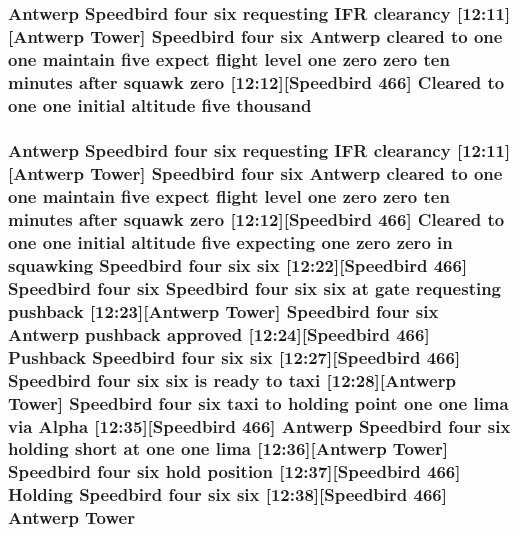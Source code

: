 \subsubsection[{\texorpdfstring{thousand}{thousand}}]{\setlength{\rightskip}{0pt plus 5cm}Antwerp Speedbird four {\bf six} requesting I\+FR clearancy \mbox{[}12\+:11\mbox{]}\mbox{[}Antwerp {\bf Tower}\mbox{]} Speedbird four {\bf six} Antwerp cleared to {\bf one} {\bf one} maintain five expect flight level {\bf one} {\bf zero} {\bf zero} {\bf ten} minutes after squawk {\bf zero} \mbox{[}12\+:12\mbox{]}\mbox{[}Speedbird 466\mbox{]} Cleared to {\bf one} {\bf one} initial altitude five thousand}\hypertarget{happyDay5ExpectedATC_8txt_a429913a0643fe14faca3dca538caa7bb}{}\label{happyDay5ExpectedATC_8txt_a429913a0643fe14faca3dca538caa7bb}
\subsubsection[{\texorpdfstring{Tower}{Tower}}]{\setlength{\rightskip}{0pt plus 5cm}Antwerp Speedbird four {\bf six} requesting I\+FR clearancy \mbox{[}12\+:11\mbox{]}\mbox{[}Antwerp Tower\mbox{]} Speedbird four {\bf six} Antwerp cleared to {\bf one} {\bf one} maintain five expect flight level {\bf one} {\bf zero} {\bf zero} {\bf ten} minutes after squawk {\bf zero} \mbox{[}12\+:12\mbox{]}\mbox{[}Speedbird 466\mbox{]} Cleared to {\bf one} {\bf one} initial altitude five expecting {\bf one} {\bf zero} {\bf zero} in {\bf squawking} Speedbird four {\bf six} {\bf six} \mbox{[}12\+:22\mbox{]}\mbox{[}Speedbird 466\mbox{]} Speedbird four {\bf six} Speedbird four {\bf six} {\bf six} at gate requesting pushback \mbox{[}12\+:23\mbox{]}\mbox{[}Antwerp Tower\mbox{]} Speedbird four {\bf six} Antwerp pushback {\bf approved} \mbox{[}12\+:24\mbox{]}\mbox{[}Speedbird 466\mbox{]} Pushback Speedbird four {\bf six} {\bf six} \mbox{[}12\+:27\mbox{]}\mbox{[}Speedbird 466\mbox{]} Speedbird four {\bf six} {\bf six} is ready to taxi \mbox{[}12\+:28\mbox{]}\mbox{[}Antwerp Tower\mbox{]} Speedbird four {\bf six} taxi to holding point {\bf one} {\bf one} {\bf lima} via {\bf Alpha} \mbox{[}12\+:35\mbox{]}\mbox{[}Speedbird 466\mbox{]} Antwerp Speedbird four {\bf six} holding short at {\bf one} {\bf one} {\bf lima} \mbox{[}12\+:36\mbox{]}\mbox{[}Antwerp Tower\mbox{]} Speedbird four {\bf six} hold {\bf position} \mbox{[}12\+:37\mbox{]}\mbox{[}Speedbird 466\mbox{]} Holding Speedbird four {\bf six} {\bf six} \mbox{[}12\+:38\mbox{]}\mbox{[}Speedbird 466\mbox{]} Antwerp Tower}\hypertarget{happyDay5ExpectedATC_8txt_aa713126cf5a2ea490c73c69abd6e8b2e}{}\label{happyDay5ExpectedATC_8txt_aa713126cf5a2ea490c73c69abd6e8b2e}

